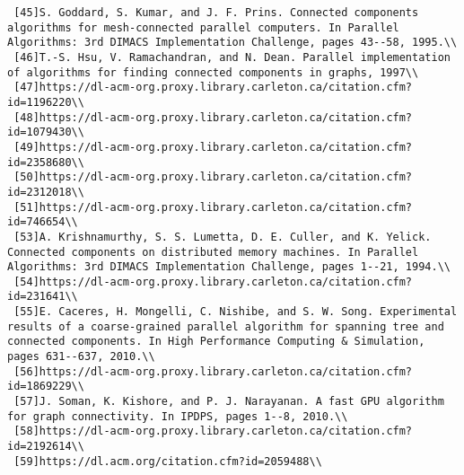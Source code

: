 \documentclass[]{article}
\begin{document}
\begin{verbatim}
 [45]S. Goddard, S. Kumar, and J. F. Prins. Connected components algorithms for mesh-connected parallel computers. In Parallel Algorithms: 3rd DIMACS Implementation Challenge, pages 43--58, 1995.\\
 [46]T.-S. Hsu, V. Ramachandran, and N. Dean. Parallel implementation of algorithms for finding connected components in graphs, 1997\\
 [47]https://dl-acm-org.proxy.library.carleton.ca/citation.cfm?id=1196220\\
 [48]https://dl-acm-org.proxy.library.carleton.ca/citation.cfm?id=1079430\\
 [49]https://dl-acm-org.proxy.library.carleton.ca/citation.cfm?id=2358680\\
 [50]https://dl-acm-org.proxy.library.carleton.ca/citation.cfm?id=2312018\\
 [51]https://dl-acm-org.proxy.library.carleton.ca/citation.cfm?id=746654\\
 [53]A. Krishnamurthy, S. S. Lumetta, D. E. Culler, and K. Yelick. Connected components on distributed memory machines. In Parallel Algorithms: 3rd DIMACS Implementation Challenge, pages 1--21, 1994.\\
 [54]https://dl-acm-org.proxy.library.carleton.ca/citation.cfm?id=231641\\
 [55]E. Caceres, H. Mongelli, C. Nishibe, and S. W. Song. Experimental results of a coarse-grained parallel algorithm for spanning tree and connected components. In High Performance Computing & Simulation, pages 631--637, 2010.\\
 [56]https://dl-acm-org.proxy.library.carleton.ca/citation.cfm?id=1869229\\
 [57]J. Soman, K. Kishore, and P. J. Narayanan. A fast GPU algorithm for graph connectivity. In IPDPS, pages 1--8, 2010.\\
 [58]https://dl-acm-org.proxy.library.carleton.ca/citation.cfm?id=2192614\\
 [59]https://dl.acm.org/citation.cfm?id=2059488\\
  \end{verbatim}
\end{document}

